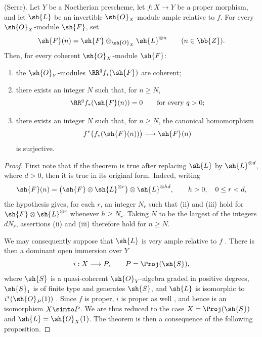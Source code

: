 \begin{theorem}[2.2.1]
\label{III.2.2.1}
(Serre).
Let $Y$ be a Noetherian prescheme, let $f:X\to Y$ be a proper morphism, and let $\sh{L}$ be an invertible $\sh{O}_X$-module ample relative to $f$.
For every $\sh{O}_X$-module $\sh{F}$, set
\[
  \sh{F}(n)=\sh{F}\otimes_{\sh{O}_X}\sh{L}^{\otimes n}
  \qquad(n\in\bb{Z}).
\]
Then, for every coherent $\sh{O}_X$-module $\sh{F}$:
\begin{enumerate}
  \item[{\rm(i)}] the $\sh{O}_Y$-modules $\RR^qf_*(\sh{F})$ are coherent;
  \item[{\rm(ii)}] there exists an integer $N$ such that, for $n\geq N$,
  \[
    \RR^qf_*(\sh{F}(n))=0
    \qquad\text{for every }q>0;
  \]
  \item[{\rm(iii)}] there exists an integer $N$ such that, for $n\geq N$, the canonical homomorphism
  \[
    f^*\bigl(f_*(\sh{F}(n))\bigr)\longrightarrow\sh{F}(n)
  \]
  is surjective.
\end{enumerate}
\end{theorem}

\begin{proof}
First note that if the theorem is true after replacing $\sh{L}$ by $\sh{L}^{\otimes d}$, where $d>0$, then it is true in its original form.
Indeed, writing
\[
  \sh{F}(n)
  =\bigl(\sh{F}\otimes\sh{L}^{\otimes r}\bigr)
   \otimes\sh{L}^{\otimes hd},
   \qquad h>0,\quad 0\leq r<d,
\]
the hypothesis gives, for each $r$, an integer $N_r$ such that (ii) and (iii) hold for $\sh{F}\otimes\sh{L}^{\otimes r}$ whenever $h\geq N_r$.
Taking $N$ to be the largest of the integers $dN_r$, assertions (ii) and (iii) therefore hold for $n\geq N$.

We may consequently suppose that $\sh{L}$ is very ample relative to $f$ .
There is then a dominant open immersion over $Y$
\[
  i:X\longrightarrow P,
  \qquad P=\Proj(\sh{S}),
\]
where $\sh{S}$ is a quasi-coherent $\sh{O}_Y$-algebra graded in positive degrees, $\sh{S}_1$ is of finite type and generates $\sh{S}$, and $\sh{L}$ is isomorphic to $i^*(\sh{O}_P(1))$ .
Since $f$ is proper, $i$ is proper as well , and hence is an isomorphism $X\simto P$.
We are thus reduced to the case $X=\Proj(\sh{S})$ and $\sh{L}=\sh{O}_X(1)$.
The theorem is then a consequence of the following proposition.
\end{proof}

